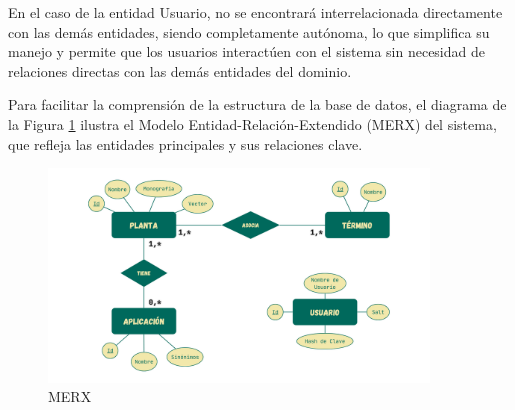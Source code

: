 En el caso de la entidad Usuario, no se encontrará interrelacionada directamente con las demás entidades, siendo completamente autónoma, lo que simplifica su manejo y permite 
que los usuarios interactúen con el sistema sin necesidad de relaciones directas con las demás entidades del dominio.

Para facilitar la comprensión de la estructura de la base de datos, el diagrama de la Figura \ref{fig:merx} ilustra el Modelo Entidad-Relación-Extendido (MERX) del sistema, que refleja las entidades principales y sus relaciones clave.

\begin{figure}[ht!]
    \centering
    \includegraphics[width=0.9\textwidth]{Images/merx_es.png}
    \caption{MERX}
    \label{fig:merx}
\end{figure}

